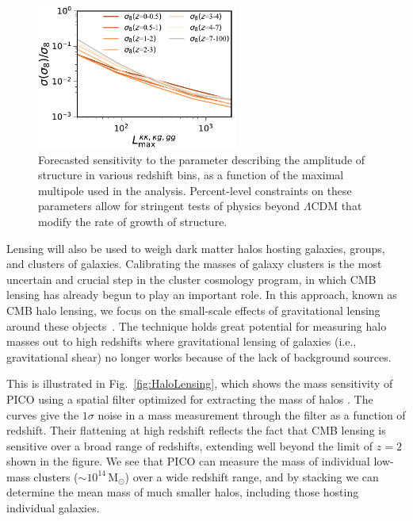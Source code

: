 \documentclass[PICOReport.tex]{subfiles}
\begin{document}
\begin{figure}
\hspace{0.1in}
\parbox{3.3in}{
\vspace{0.15in}
\caption{\captiontext  
Forecasted sensitivity to  the parameter describing the amplitude of structure in various redshift bins, as a function of the maximal multipole used in the analysis.  Percent-level constraints on these parameters allow for stringent tests of physics beyond $\Lambda$CDM that modify the rate of growth of structure. 
\label{fig:sigma8constraint} 
} }
\hspace{0.1in}
\parbox{2.9in}{\centerline {
\includegraphics[width=2.6in]{images/PICO_s8_lmax_PICOv4.1b_deproj0_SENS0.pdf} } }
\vspace{-0.1in}
\end{figure}


Lensing will also be used to weigh dark matter halos hosting galaxies, groups, and clusters of galaxies.  Calibrating the masses of galaxy clusters is the most uncertain and crucial step in the cluster cosmology program, in which CMB lensing has already begun to play an important role.  In this approach, known as CMB halo lensing, we focus on the small-scale effects of gravitational lensing around these objects~\citep{2015ApJ...806..247B, 2015PhRvL.114o1302M, 2016A&A...594A..24P}. The technique holds great potential for measuring halo masses out to high redshifts where gravitational lensing of galaxies (i.e., gravitational shear) no longer works because of the lack of background sources.

This is illustrated in Fig.~\ref{fig:HaloLensing}, which shows the mass sensitivity of PICO using a spatial filter optimized for extracting the mass of halos \citep{2015A&A...578A..21M}.  The curves give the $1\sigma$ noise in a mass measurement through the filter as a function of redshift. Their flattening at high redshift reflects the fact that CMB lensing is sensitive over a broad range of redshifts, extending well beyond the limit of $z=2$ shown in the figure.  We see that PICO can measure the mass of individual low-mass clusters ($\sim 10^{14}$\,M$_\odot$) over a wide redshift range, and by stacking we can determine the mean mass of much smaller halos, including those hosting individual galaxies.  
\end{document}
